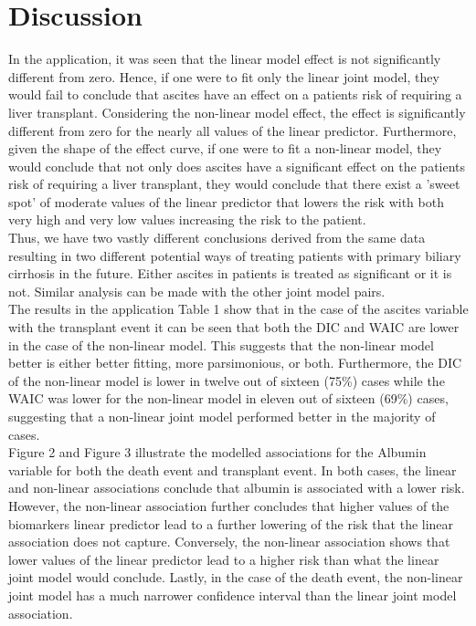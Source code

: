 \documentclass[english]{article}
\theoremstyle{plain}
\begin{document}
\section{Discussion}


In the application, it was seen that the linear model effect is not significantly different from zero. Hence, if one were to fit only the linear joint model, they would fail to conclude that ascites have an effect on a patients risk of requiring a liver transplant. Considering the non-linear model effect, the effect is significantly different from zero for the nearly all values of the linear predictor. Furthermore, given the shape of the effect curve, if one were to fit a non-linear model, they would conclude that not only does ascites have a significant effect on the patients risk of requiring a liver transplant, they would conclude that there exist a 'sweet spot' of moderate values of the linear predictor that lowers the risk with both very high and very low values increasing the risk to the patient.
\\

Thus, we have two vastly different conclusions derived from the same data resulting in two different potential ways of treating patients with primary biliary cirrhosis in the future. Either ascites in patients is treated as significant or it is not. Similar analysis can be made with the other joint model pairs.
\\

The results in the application Table 1 show that in the case of the ascites variable with the transplant event it can be seen that both the DIC and WAIC are lower in the case of the non-linear model. This suggests that the non-linear model better is either better fitting, more parsimonious, or both. Furthermore, the DIC of the non-linear model is lower in twelve out of sixteen (75\%) cases while the WAIC was lower for the non-linear model in eleven out of sixteen (69\%) cases, suggesting that a non-linear joint model performed better in the majority of cases.
\\

Figure 2 and Figure 3 illustrate the modelled associations for the Albumin variable for both the death event and transplant event. In both cases, the linear and non-linear associations conclude that albumin is associated with a lower risk. However, the non-linear association further concludes that higher values of the biomarkers linear predictor lead to a further lowering of the risk that the linear association does not capture. Conversely, the non-linear association shows that lower values of the linear predictor lead to a higher risk than what the linear joint model would conclude. Lastly, in the case of the death event, the non-linear joint model has a much narrower confidence interval than the linear joint model association.\\
\end{document}
